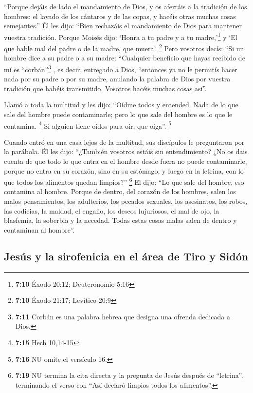 ``Porque dejáis de lado el mandamiento de Dios, y os
aferráis a la tradición de los hombres: el lavado de los cántaros y de
las copas, y hacéis otras muchas cosas semejantes.''  Él
les dijo: ``Bien rechazáis el mandamiento de Dios para mantener vuestra
tradición.  Porque Moisés dijo: `Honra a tu padre y a tu
madre,'\footnote{\textbf{7:10} Éxodo 20:12; Deuteronomio 5:16} y `El que
hable mal del padre o de la madre, que muera'. \footnote{\textbf{7:10}
  Éxodo 21:17; Levítico 20:9}  Pero vosotros decís: ``Si
un hombre dice a su padre o a su madre: ``Cualquier beneficio que hayas
recibido de mí es ``corbán''\footnote{\textbf{7:11} Corbán es una
  palabra hebrea que designa una ofrenda dedicada a Dios.} , es decir,
entregado a Dios,  ``entonces ya no le permitís hacer
nada por su padre o por su madre,  anulando la palabra de
Dios por vuestra tradición que habéis transmitido. Vosotros hacéis
muchas cosas así''.

 Llamó a toda la multitud y les dijo: ``Oídme todos y
entended.  Nada de lo que sale del hombre puede
contaminarle; pero lo que sale del hombre es lo que le contamina.
\footnote{\textbf{7:15} Hech 10,14-15}  Si alguien tiene
oídos para oír, que oiga''. \footnote{\textbf{7:16} NU omite el
  versículo 16.}

 Cuando entró en una casa lejos de la multitud, sus
discípulos le preguntaron por la parábola.  Él les dijo:
``¿También vosotros estáis sin entendimiento? ¿No os dais cuenta de que
todo lo que entra en el hombre desde fuera no puede contaminarle,
 porque no entra en su corazón, sino en su estómago, y
luego en la letrina, con lo que todos los alimentos quedan limpios?''
\footnote{\textbf{7:19} NU termina la cita directa y la pregunta de
  Jesús después de ``letrina'', terminando el verso con ``Así declaró
  limpios todos los alimentos''.}  El dijo: ``Lo que sale
del hombre, eso contamina al hombre.  Porque de dentro,
del corazón de los hombres, salen los malos pensamientos, los
adulterios, los pecados sexuales, los asesinatos, los robos,
 las codicias, la maldad, el engaño, los deseos
lujuriosos, el mal de ojo, la blasfemia, la soberbia y la necedad.
 Todas estas cosas malas salen de dentro y contaminan al
hombre''.

\hypertarget{jesuxfas-y-la-sirofenicia-en-el-uxe1rea-de-tiro-y-siduxf3n}{%
\subsection{Jesús y la sirofenicia en el área de Tiro y
Sidón}\label{jesuxfas-y-la-sirofenicia-en-el-uxe1rea-de-tiro-y-siduxf3n}}

